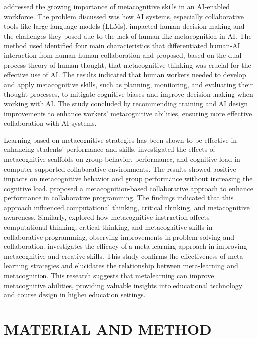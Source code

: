 \documentclass[a4paper,twoside]{article}
\begin{document}
\cite{Sidra24} addressed the growing importance of metacognitive skills in an
AI-enabled workforce. The problem discussed was how AI systems, especially
collaborative tools like large language models (LLMs), impacted human
decision-making and the challenges they posed due to the lack of human-like
metacognition in AI. The method used identified four main characteristics that
differentiated human-AI interaction from human-human collaboration and proposed,
based on the dual-process theory of human thought, that metacognitive thinking
was crucial for the effective use of AI. The results indicated that human
workers needed to develop and apply metacognitive skills, such as planning,
monitoring, and evaluating their thought processes, to mitigate cognitive biases
and improve decision-making when working with AI. The study concluded by
recommending training and AI design improvements to enhance workers’
metacognitive abilities, ensuring more effective collaboration with AI systems.

Learning based on metacognitive strategies has been shown to be effective in
enhancing students’ performance and skills. \cite{Zheng19} investigated the
effects of metacognitive scaffolds on group behavior, performance, and cognitive
load in computer-supported collaborative environments. The results showed
positive impacts on metacognitive behavior and group performance without
increasing the cognitive load. \cite{LiWei23} proposed a metacognition-based
collaborative approach to enhance performance in collaborative programming. The
findings indicated that this approach influenced computational thinking,
critical thinking, and metacognitive awareness. Similarly, \cite{Wang23}
explored how metacognitive instruction affects computational thinking, critical
thinking, and metacognitive skills in collaborative programming, observing
improvements in problem-solving and collaboration. \cite{Khusnul24} investigates
the efficacy of a meta-learning approach in improving metacognitive and creative
skills. This study confirms the effectiveness of meta-learning strategies and
elucidates the relationship between meta-learning and metacognition. This
research suggests that metalearning can improve metacognitive abilities,
providing valuable insights into educational technology and course design in
higher education settings.

\section{\uppercase{Material and Method}}
\end{document}
